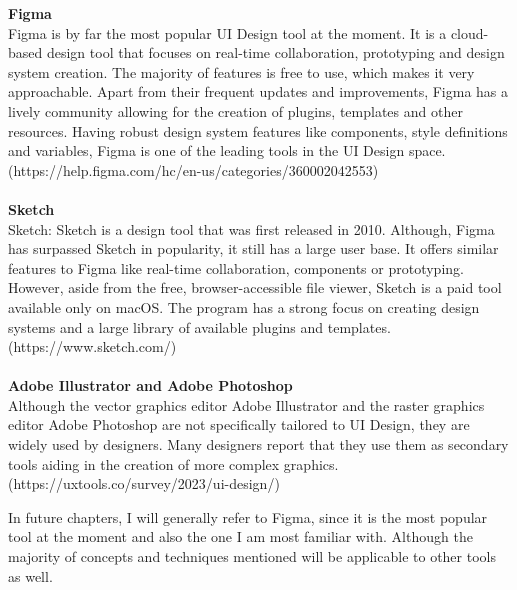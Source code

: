 \textbf{Figma}\\
Figma is by far the most popular UI Design tool at the moment. It is a cloud-based design tool
that focuses on real-time collaboration, prototyping and design system creation. The majority of
features is free to use, which makes it very approachable. Apart from their frequent updates and
improvements, Figma has a lively community allowing for the creation of plugins, templates and other
resources. Having robust design system features like components, style definitions and variables,
Figma is one of the leading tools in the UI Design space.
(https://help.figma.com/hc/en-us/categories/360002042553)\\\\
\textbf{Sketch}\\
Sketch: Sketch is a design tool that was first released in 2010. Although, Figma has surpassed
Sketch in popularity, it still has a large user base. It offers similar features to Figma like
real-time collaboration, components or prototyping. However, aside from the free, browser-accessible
file viewer, Sketch is a paid tool available only on macOS. The program has a strong focus on
creating design systems and a large library of available plugins and templates.
(https://www.sketch.com/)\\\\
\textbf{Adobe Illustrator and Adobe Photoshop}\\
Although the vector graphics editor Adobe Illustrator and the raster graphics editor Adobe Photoshop
are not specifically tailored to UI Design, they are widely used by designers. Many designers report
that they use them as secondary tools aiding in the creation of more complex graphics. (https://uxtools.co/survey/2023/ui-design/)

In future chapters, I will generally refer to Figma, since it is the most popular tool at the moment
and also the one I am most familiar with. Although the majority of concepts and techniques mentioned
will be applicable to other tools as well.
